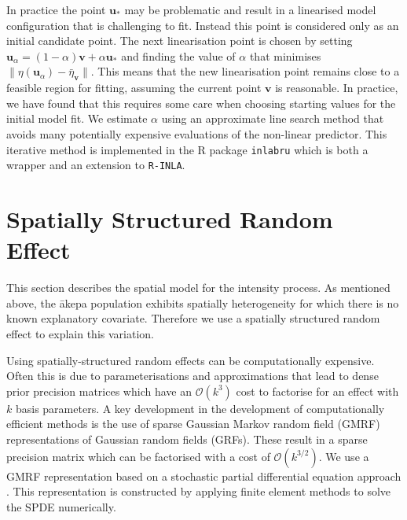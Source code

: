 \documentclass{stylefile16/statsoc}
\newcommand{\bm}{\boldsymbol}  %
\newcommand{\akepa}{\textquotesingle\={a}kepa}  %
\begin{document}
In practice the point $\bm{u}_*$ may be problematic and result in a linearised model configuration that is challenging to fit.  Instead this point is considered only as an initial candidate point.  The next linearisation point is chosen by setting $\bm{u}_{\alpha} = (1 - \alpha)\bm{v} + \alpha \bm{u}_*$ and finding the value of $\alpha$ that minimises $ \lVert \eta(\bm{u}_{\alpha}) - \bar{\eta}_{\bm{v}} \rVert$.  This means that the new linearisation point remains close to a feasible region for fitting, assuming the current point $\bm{v}$ is reasonable.  In practice, we have found that this requires some care when choosing starting values for the initial model fit.  We estimate $\alpha$ using an approximate line search method that avoids many potentially expensive evaluations of the non-linear predictor.  This iterative method is implemented in the R package \texttt{inlabru} \citep{bachl_inlabru_2019} which is both a wrapper and an extension to \texttt{R-INLA}.

\section{Spatially Structured Random Effect}
\label{sec-gmrf}

This section describes the spatial model for the intensity process.  
As mentioned above, the \akepa{} population exhibits spatially heterogeneity for which there is no known explanatory covariate.  Therefore we use a spatially structured random effect to explain this variation.

Using spatially-structured random effects can be computationally expensive.  Often this is due to parameterisations and approximations that lead to dense prior precision matrices which have an  $\mathcal{O}(k^3)$ cost to factorise for an effect with $k$ basis parameters.  A key development in the development of computationally efficient methods is the use of sparse Gaussian Markov random field (GMRF) representations of Gaussian random fields (GRFs).  These result in a sparse precision matrix which can be factorised with a cost of $\mathcal{O}(k^{3/2})$.  We use a GMRF representation based on a stochastic partial differential equation approach \citep{lindgren_explicit_2011}.  This representation is constructed by applying finite element methods to solve the SPDE numerically.
\end{document}
